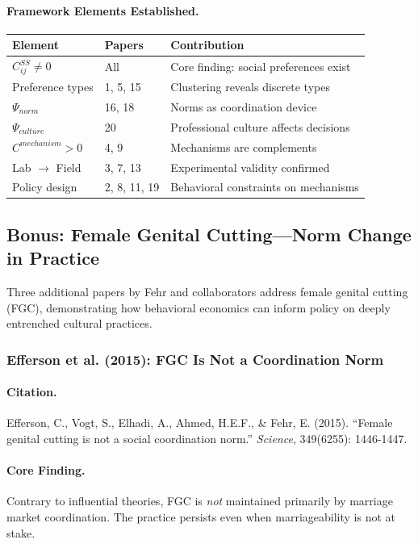 \documentclass[12pt,a4paper]{article}
\begin{document}
\paragraph{Framework Elements Established.}

\begin{center}
\renewcommand{\arraystretch}{1.2}
\small
\begin{tabular}{lll}
\hline
\textbf{Element} & \textbf{Papers} & \textbf{Contribution} \\
\hline
$C^{SS}_{ij} \neq 0$ & All & Core finding: social preferences exist \\
Preference types & 1, 5, 15 & Clustering reveals discrete types \\
$\Psi_{norm}$ & 16, 18 & Norms as coordination device \\
$\Psi_{culture}$ & 20 & Professional culture affects decisions \\
$C^{mechanism} > 0$ & 4, 9 & Mechanisms are complements \\
Lab $\to$ Field & 3, 7, 13 & Experimental validity confirmed \\
Policy design & 2, 8, 11, 19 & Behavioral constraints on mechanisms \\
\hline
\end{tabular}
\end{center}

\subsection{Bonus: Female Genital Cutting---Norm Change in Practice}

Three additional papers by Fehr and collaborators address female genital
cutting (FGC), demonstrating how behavioral economics can inform policy
on deeply entrenched cultural practices.

\subsubsection{Efferson et al. (2015): FGC Is Not a Coordination Norm}

\paragraph{Citation.}
Efferson, C., Vogt, S., Elhadi, A., Ahmed, H.E.F., \& Fehr, E. (2015).
``Female genital cutting is not a social coordination norm.''
\emph{Science}, 349(6255): 1446-1447.

\paragraph{Core Finding.}
Contrary to influential theories, FGC is \emph{not} maintained primarily
by marriage market coordination. The practice persists even when
marriageability is not at stake.
\end{document}
